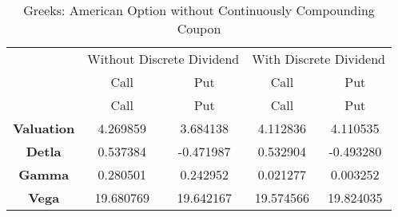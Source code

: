\documentclass[11pt,en]{elegantpaper}
\begin{document}
\begin{table}[htbp]
    \centering
    \caption{Greeks: American Option without Continuously Compounding Coupon}
    \begin{tabular}{@{}ccccc@{}}
    \toprule
                                                                                       & \multicolumn{2}{c}{Without Discrete Dividend} & \multicolumn{2}{c}{With Discrete Dividend} \\
                                                                                       & Call                  & Put                   & Call                 & Put                 \\
                                                                                       \midrule
                                                                                       & Call                                        & Put                                        & Call                                      & Put                                       \\
                                                                                       \textbf{Valuation}                                                                 & 4.269859                                    & 3.684138                                   & 4.112836                                  & 4.110535                                  \\
                                                                                       \textbf{Detla}                                                                     & 0.537384                                    & -0.471987                                  & 0.532904                                  & -0.493280                                 \\
                                                                                       \textbf{Gamma}                                                                     & 0.280501                                    & 0.242952                                   & 0.021277                                  & 0.003252                                  \\
                                                                                       \textbf{Vega}                                                                      & 19.680769                                   & 19.642167                                  & 19.574566                                 & 19.824035                                 \\

\end{tabular}
\end{table}
\end{document}
